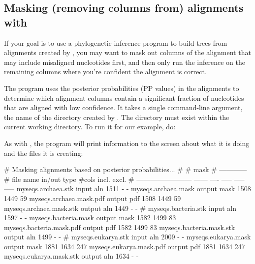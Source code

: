 \subsection{Masking (removing columns from) alignments with }

If your goal is to use a phylogenetic inference program to build trees
from alignments created by , you may want to mask
out columns of the alignment that may include misaligned nucleotides
first, and then only run the inference on the remaining columns where
you're confident the alignment is correct. 

The  program uses the posterior probabilities
(PP values) in the alignments to determine which alignment columns
contain a significant fraction of nucleotides that are aligned with
low confidence. It takes a single command-line argument, the name of
the directory created by . The directory must exist
within the current working directory. To run it for our example, do: 


As with , the program will print information to the
screen about what it is doing and the files it is creating:

\begin{sreoutput}
# Masking alignments based on posterior probabilities...
#
#                                                    mask    
#                                                ------------
# file name                 in/out  type  #cols  incl.  excl.
# ------------------------  ------  ----  -----  -----  -----
  myseqs.archaea.stk         input   aln   1511      -      -
  myseqs.archaea.mask       output  mask   1508   1449     59
  myseqs.archaea.mask.pdf   output   pdf   1508   1449     59
  myseqs.archaea.mask.stk   output   aln   1449      -      -
#
  myseqs.bacteria.stk        input   aln   1597      -      -
  myseqs.bacteria.mask      output  mask   1582   1499     83
  myseqs.bacteria.mask.pdf  output   pdf   1582   1499     83
  myseqs.bacteria.mask.stk  output   aln   1499      -      -
#
  myseqs.eukarya.stk         input   aln   2009      -      -
  myseqs.eukarya.mask       output  mask   1881   1634    247
  myseqs.eukarya.mask.pdf   output   pdf   1881   1634    247
  myseqs.eukarya.mask.stk   output   aln   1634      -      -
\end{sreoutput}

